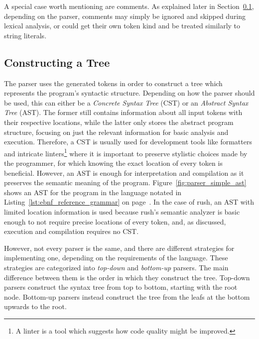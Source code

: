 A special case worth mentioning are comments.
As explained later in Section~\ref{sec:constructing_a_tree}, depending on the parser, comments may simply be ignored and skipped during lexical analysis, or could get their own token kind and be treated similarly to string literals.

\subsection{Constructing a Tree}\label{sec:constructing_a_tree}

The parser uses the generated tokens in order to construct a tree which represents the program's syntactic structure.
Depending on how the parser should be used, this can either be a \emph{Concrete Syntax Tree} (CST) or an \emph{Abstract Syntax Tree} (AST).
The former still contains%
%
%
information about all input tokens with their respective locations, while the latter only stores the abstract program structure, focusing on just the relevant information for basic analysis and execution.
Therefore, a CST is usually used for development tools like formatters and intricate linters\footnote{A linter is a tool which suggests how code quality might be improved.} where it is important to preserve stylistic choices made by the programmer, for which knowing the exact location of every token is beneficial.
However, an AST is enough for interpretation and compilation as it preserves the semantic meaning of the program.
Figure~\ref{fig:parser_simple_ast} shows an AST for the program  in the language notated in Listing~\ref{lst:ebnf_reference_grammar} on page~\pageref{lst:ebnf_reference_grammar}.
In the case of rush, an AST with limited location information is used because rush's semantic analyzer is basic enough to not require precise locations of every token, and, as discussed, execution and compilation requires no CST\@.

However, not every parser is the same, and there are different strategies for implementing one, depending on the requirements of the language.
These strategies are categorized into \emph{top-down} and \emph{bottom-up} parsers.
The main difference between them is the order in which they construct the tree.
Top-down parsers construct the syntax tree from top to bottom, starting with the root node.
Bottom-up parsers instead construct the tree from the leafs at the bottom upwards to the root.


